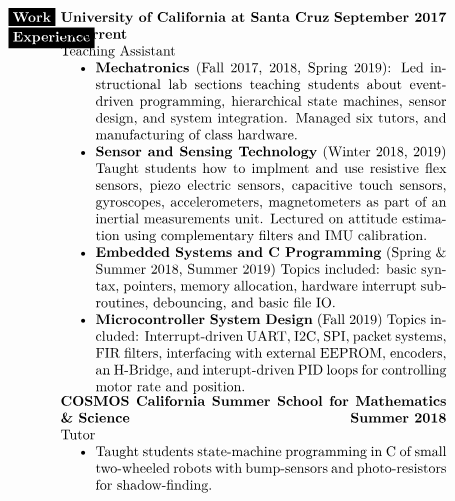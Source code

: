\documentclass[paper=a4,fontsize=10pt]{article} %
\def \mainColWidth {0.8\textwidth}		%
\def \leftColWidth {0.05\textwidth}		%
\begin{document}
\begin{align*}
\begin{array}[t]{l}
{		}%
	\end{array}
	&\\
	&
	\begin{array}[t]{l} 
	\parbox[t]{\leftColWidth}{%
		\colorbox{black}{\color{white}{\textbf{Work}}} \\ \colorbox{black}{\color{white}{\textbf{Experience}}}
	}%
	\end{array}
	&
	\begin{array}[t]{l}
		\parbox[t]{\mainColWidth}{%
			\textbf{University of California at Santa Cruz} \hfill \textbf{September 2017 - Current}\\
			\quad Teaching Assistant
			\begin{itemize}[noitemsep,topsep=0pt]
			\item \textbf{Mechatronics} (Fall 2017, 2018, Spring 2019): Led instructional lab sections teaching students about event-driven programming, hierarchical state machines, sensor design, and system integration. Managed six tutors, and manufacturing of class hardware.
			\item \textbf{Sensor and Sensing Technology} (Winter 2018, 2019) Taught students how to implment and use resistive flex sensors, piezo electric sensors, capacitive touch sensors, gyroscopes, accelerometers, magnetometers as part of an inertial measurements unit. Lectured on attitude estimation using complementary filters and IMU calibration.
			\item \textbf{Embedded Systems and C Programming} (Spring \& Summer 2018, Summer 2019) Topics included: basic syntax, pointers, memory allocation, hardware interrupt sub-routines, debouncing, and basic file IO.
			\item \textbf{Microcontroller System Design} (Fall 2019) Topics included: Interrupt-driven UART, I2C, SPI, packet systems, FIR filters, interfacing with external EEPROM, encoders, an H-Bridge, and interupt-driven PID loops for controlling motor rate and position. 
			\end{itemize}
		}%
		\\
		\parbox[t]{\mainColWidth}{%
			\textbf{COSMOS California Summer School for Mathematics \& Science}  \hfill \textbf{Summer 2018}\\
			\quad Tutor
			\begin{itemize}[noitemsep,topsep=0pt]
			\item Taught students state-machine programming in C of small two-wheeled robots with bump-sensors and photo-resistors for shadow-finding.

\end{itemize}}
\end{array}
\end{align*}
\end{document}
